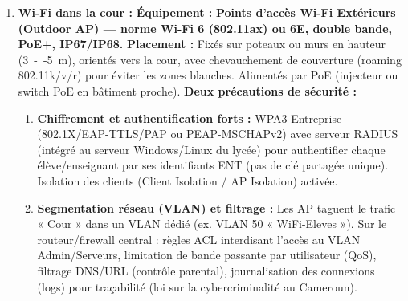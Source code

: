 \documentclass[11pt]{article}
\begin{document}
\begin{corrige}
\begin{enumerate}
  \item \textbf{Wi-Fi dans la cour :}
  \textbf{Équipement :} \textbf{Points d'accès Wi-Fi Extérieurs (Outdoor AP) — norme Wi-Fi 6 (802.11ax) ou 6E, double bande, PoE+, IP67/IP68.}
  \textbf{Placement :} Fixés sur poteaux ou murs en hauteur (\SI{3}{--}\SI{5}{m}), orientés vers la cour, avec chevauchement de couverture (roaming 802.11k/v/r) pour éviter les zones blanches. Alimentés par PoE (injecteur ou switch PoE en bâtiment proche).
  \textbf{Deux précautions de sécurité :}
  \begin{enumerate}
    \item \textbf{Chiffrement et authentification forts :} WPA3-Entreprise (802.1X/EAP-TTLS/PAP ou PEAP-MSCHAPv2) avec serveur RADIUS (intégré au serveur Windows/Linux du lycée) pour authentifier chaque élève/enseignant par ses identifiants ENT (pas de clé partagée unique). Isolation des clients (Client Isolation / AP Isolation) activée.
    \item \textbf{Segmentation réseau (VLAN) et filtrage :} Les AP taguent le trafic « Cour » dans un VLAN dédié (ex. VLAN 50 « WiFi-Eleves »). Sur le routeur/firewall central : règles ACL interdisant l'accès au VLAN Admin/Serveurs, limitation de bande passante par utilisateur (QoS), filtrage DNS/URL (contrôle parental), journalisation des connexions (logs) pour traçabilité (loi sur la cybercriminalité au Cameroun).
  \end{enumerate}
\end{enumerate}
\end{corrige}
\end{document}
